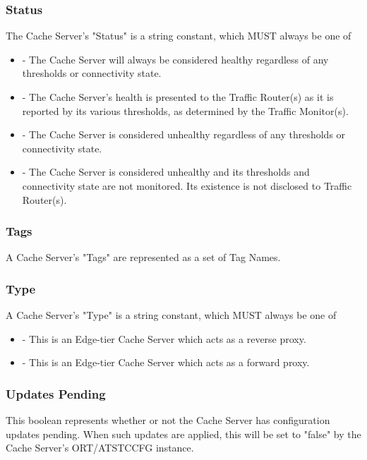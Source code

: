 \subsubsection{Status}
The Cache Server's "Status" is a string constant, which MUST always be one of

\begin{itemize}
	\item {} - The Cache Server will always be considered healthy
	regardless of any thresholds or connectivity state.
	\item {} - The Cache Server's health is presented to the Traffic
	Router(s) as it is reported by its various thresholds, as determined by the
	Traffic Monitor(s).
	\item {} - The Cache Server is considered unhealthy regardless of
	any thresholds or connectivity state.
	\item {} - The Cache Server is considered unhealthy and its
	thresholds and connectivity state are not monitored. Its existence is not
	disclosed to Traffic Router(s).
\end{itemize}

\subsubsection{Tags}
A Cache Server's "Tags" are represented as a set of Tag Names.

\subsubsection{Type}
A Cache Server's "Type" is a string constant, which MUST always be one of

\begin{itemize}
	\item {} - This is an Edge-tier Cache Server which acts as a reverse
	proxy.
	\item {} - This is an Edge-tier Cache Server which acts as a forward
	proxy.
\end{itemize}

\subsubsection{Updates Pending}
This boolean represents whether or not the Cache Server has configuration updates
pending. When such updates are applied, this will be set to "false" by the Cache
Server's ORT/ATSTCCFG instance.


